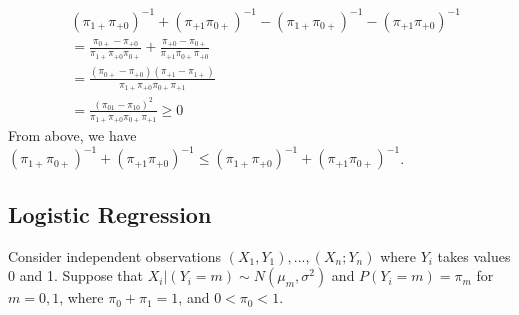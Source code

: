 \documentclass[11pt]{article} %
\begin{document}
\begin{itemize}
\begin{align*}
		&(\pi_{1+}\pi_{+0})^{-1} + (\pi_{+1}\pi_{0+})^{-1} - (\pi_{1+}\pi_{0+})^{-1} - (\pi_{+1}\pi_{+0})^{-1}\\
		&= \frac{\pi_{0+}- \pi_{+0}}{\pi_{1+}\pi_{+0}\pi_{0+}} + \frac{\pi_{+0} - \pi_{0+}}{\pi_{+1}\pi_{0+}\pi_{+0}}\\
		&= \frac{(\pi_{0+}-\pi_{+0})(\pi_{+1}-\pi_{1+})}{\pi_{1+}\pi_{+0}\pi_{0+}\pi_{+1}}\\
		&=  \frac{(\pi_{01}-\pi_{10})^2}{\pi_{1+}\pi_{+0}\pi_{0+}\pi_{+1}} \geq 0
	\end{align*}
	From above, we have $(\pi_{1+}\pi_{0+})^{-1} + (\pi_{+1}\pi_{+0})^{-1} \leq (\pi_{1+}\pi_{+0})^{-1} + (\pi_{+1}\pi_{0+})^{-1}$.
\end{itemize}
\subsection{Logistic Regression}
Consider independent observations $(X_1, Y_1),..., (X_n; Y_n)$ where $Y_i$ takes values 0 and
1. Suppose that $X_i|(Y_i = m) \sim N(\mu_m, \sigma^2)$ and $P(Y_i = m) = \pi_m$ for $m = 0, 1$, where
$\pi_0 + \pi_1 = 1$, and $0 < \pi_0 < 1$.
\end{document}

